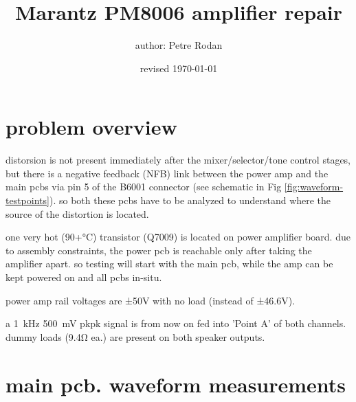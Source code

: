 \documentclass[a4paper,twoside]{report}
\begin{document}
\title{\textbf{Marantz PM8006} amplifier repair}
\author{author: Petre Rodan}
\date{revised \today}
\maketitle

%


\tableofcontents

\section{problem overview} \label{sec:problem-overview}

distorsion is not present immediately after the mixer/selector/tone control stages, but there is a negative feedback (NFB) link between the power amp and the main pcbs via pin 5 of the B6001 connector (see schematic in Fig \ref{fig:waveform-testpoints}). so both these pcbs have to be analyzed to understand where the source of the distortion is located.


one very hot (90+\si{\celsius}) transistor (Q7009) is located on power amplifier board. due to assembly constraints, the power pcb is reachable only after taking the amplifier apart. so testing will start with the main pcb, while the amp can be kept powered on and all pcbs in-situ.

power amp rail voltages are ±50V with no load (instead of ±46.6V).

a \SI{1}{\kilo\hertz} \SI{500}{\milli\volt} pkpk signal is from now on fed into 'Point A' of both channels. dummy loads (9.4\si{\ohm} ea.) are present on both speaker outputs.

\newpage

\section{main pcb. waveform measurements} \label{sec:waveform-measurements}
\end{document}
